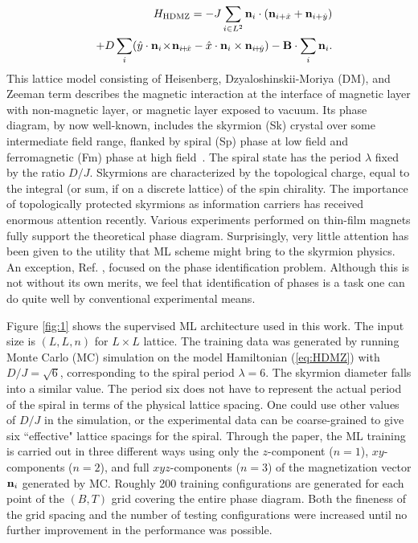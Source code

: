 \documentclass[reprint,amsmath,amssymb,aps,showpacs,superscriptaddress,prl]{revtex4-1}
\newcommand{\ba}{\begin{eqnarray}}
\newcommand{\ea}{\end{eqnarray}}
\renewcommand{\v}[1]{{\bf #1}}
\newcommand{\nn}{\nonumber \\}
\begin{document}
\ba && H_{\rm HDMZ} = -J \sum_{i\in L^2} \v n_i \cdot (\v n_{i+\hat{x}} + \v n_{i+\hat{y}} ) \nn
 & & + D \sum_i ( \hat{y} \cdot \v n_i \! \times \! \v n_{i\! +\! \hat{x}} - \hat{x} \cdot \v n_i \times \v n_{i\! +\! \hat{y}} )  - \v B \cdot \sum_i \v n_i .  \label{eq:HDMZ} \ea
%
This lattice model  consisting of Heisenberg, Dzyaloshinskii-Moriya (DM), and Zeeman term
describes the magnetic interaction at the interface of magnetic layer with non-magnetic layer, or magnetic layer exposed to vacuum. Its phase diagram, by now well-known, includes the skyrmion (Sk) crystal over some intermediate field range, flanked by spiral (Sp) phase at low field and ferromagnetic (Fm) phase at high field~\cite{nagaosa-review,skyrmion-book,jiang-review,fert-review,han-book}. The spiral state has the period $\lambda$ fixed by the ratio $D/J$. Skyrmions are characterized by the topological charge, equal to the integral (or sum, if on a discrete lattice) of the spin chirality. The importance of topologically protected skyrmions as information carriers has received enormous attention recently. 
Various experiments performed on thin-film magnets fully support the theoretical phase diagram. Surprisingly, very little attention has been given to the utility that ML scheme might bring to the skyrmion physics. An exception, Ref. \cite{russian18}, focused on the phase identification problem. Although this is not without its own merits, we feel that identification of phases is a task one can do quite well by conventional experimental means.

Figure \ref{fig:1} shows the supervised ML architecture used in this work. The input size is $(L,L,n)$ for $L\times L$ lattice.  The training data was generated by running Monte Carlo (MC) simulation on the model Hamiltonian (\ref{eq:HDMZ}) with $D/J=\sqrt{6}$, corresponding to the spiral period $\lambda=6$. The skyrmion diameter falls into a similar value. The period six does not have to  represent the actual period of the spiral in terms of the physical lattice spacing. One could use other values of $D/J$ in the simulation, or the experimental data can be coarse-grained to give six ``effective" lattice spacings for the spiral. Through the paper, the ML training is carried out in three different ways using only the $z$-component ($n=1$), $xy$-components ($n=2$), and full $xyz$-components ($n=3$) of the magnetization vector $\v n_i$ generated by MC. Roughly 200 training configurations are generated for each point of the $(B, T)$ grid covering the entire phase diagram. Both the fineness of the grid spacing and the number of testing configurations were increased until no further improvement in the performance was possible.
\end{document}
